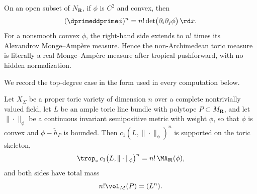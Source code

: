 On an open subset of $N_{\mathbf R}$, if $\phi$ is $C^2$ and convex,
then
\begin{equation}
                  (\dprimeddprime\phi)^n
                    =n!\det\bigl(\partial_i\partial_j\phi\bigr)\,\rd x.
\label{eq:real-ma-density}
\end{equation}
For a nonsmooth convex $\phi$, the right-hand side extends to
$n!$ times its Alexandrov Monge--Amp\`ere measure.  Hence the
non-Archimedean toric measure is literally a real Monge--Amp\`ere measure
after tropical pushforward, with no hidden normalization.

We record the top-degree case in the form used in every computation below.

\begin{theorem}
\label{thm:ch19-toric-ma}
Let $X_\Sigma$ be a proper toric variety of dimension $n$ over a
complete nontrivially valued field, let $L$ be an ample toric line bundle
with polytope $P\subset M_{\mathbf R}$, and let $\|\cdot\|_\phi$ be a
continuous invariant semipositive metric with weight $\phi$, so that
$\phi$ is convex and $\phi-\check h_P$ is bounded.  Then
$c_1(L,\|\cdot\|_\phi)^n$ is supported on the toric skeleton,
\begin{equation}
\label{eq:ch19-toric-ma}
 \trop_*\,c_1\bigl(L,\|\cdot\|_\phi\bigr)^n
 =n!\,\MA_{\mathbf R}(\phi),
\end{equation}
and both sides have total mass
\[
                     n!\vol_M(P)=(L^n).
\]
\end{theorem}

